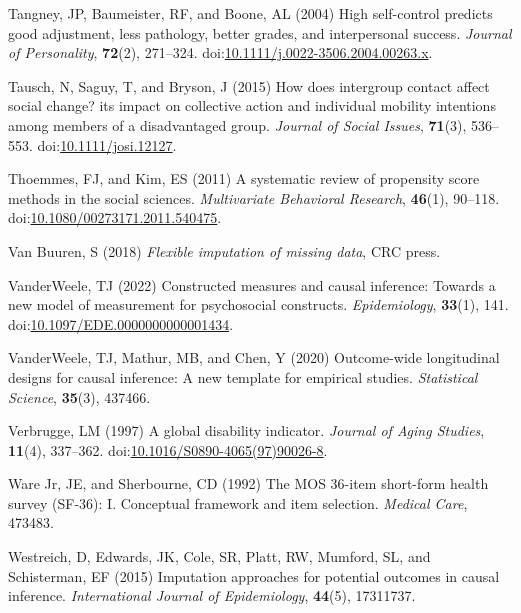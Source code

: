 \documentclass[
  singlecolumn,
  9pt]{scrartcl}
\newlength{\cslhangindent}
\newenvironment{CSLReferences}[2] %
 {\begin{list}{}{%
  \setlength{\itemindent}{0pt}
  \setlength{\leftmargin}{0pt}
  \setlength{\parsep}{0pt}
  \ifodd #1
   \setlength{\leftmargin}{\cslhangindent}
   \setlength{\itemindent}{-1\cslhangindent}
  \fi
  \setlength{\itemsep}{#2\baselineskip}}}
 {\end{list}}
\begin{document}
\begin{CSLReferences}{1}{0}
Tangney, JP, Baumeister, RF, and Boone, AL (2004) High self-control
predicts good adjustment, less pathology, better grades, and
interpersonal success. \emph{Journal of Personality}, \textbf{72}(2),
271--324.
doi:\href{https://doi.org/10.1111/j.0022-3506.2004.00263.x}{10.1111/j.0022-3506.2004.00263.x}.

Tausch, N, Saguy, T, and Bryson, J (2015) How does intergroup contact
affect social change? its impact on collective action and individual
mobility intentions among members of a disadvantaged group.
\emph{Journal of Social Issues}, \textbf{71}(3), 536--553.
doi:\href{https://doi.org/10.1111/josi.12127}{10.1111/josi.12127}.

Thoemmes, FJ, and Kim, ES (2011) A systematic review of propensity score
methods in the social sciences. \emph{Multivariate Behavioral Research},
\textbf{46}(1), 90--118.
doi:\href{https://doi.org/10.1080/00273171.2011.540475}{10.1080/00273171.2011.540475}.

Van Buuren, S (2018) \emph{Flexible imputation of missing data}, CRC
press.

VanderWeele, TJ (2022) Constructed measures and causal inference:
Towards a new model of measurement for psychosocial constructs.
\emph{Epidemiology}, \textbf{33}(1), 141.
doi:\href{https://doi.org/10.1097/EDE.0000000000001434}{10.1097/EDE.0000000000001434}.

VanderWeele, TJ, Mathur, MB, and Chen, Y (2020) Outcome-wide
longitudinal designs for causal inference: A new template for empirical
studies. \emph{Statistical Science}, \textbf{35}(3), 437466.

Verbrugge, LM (1997) A global disability indicator. \emph{Journal of
Aging Studies}, \textbf{11}(4), 337--362.
doi:\href{https://doi.org/10.1016/S0890-4065(97)90026-8}{10.1016/S0890-4065(97)90026-8}.

Ware Jr, JE, and Sherbourne, CD (1992) The MOS 36-item short-form health
survey (SF-36): I. Conceptual framework and item selection.
\emph{Medical Care}, 473483.

Westreich, D, Edwards, JK, Cole, SR, Platt, RW, Mumford, SL, and
Schisterman, EF (2015) Imputation approaches for potential outcomes in
causal inference. \emph{International Journal of Epidemiology},
\textbf{44}(5), 17311737.


\end{CSLReferences}
\end{document}
